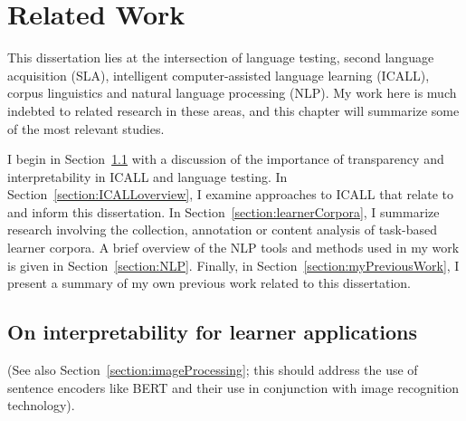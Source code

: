 \chapter{Related Work}
\label{chap:lit}

This dissertation lies at the intersection of language testing, second language acquisition (SLA), intelligent computer-assisted language learning (ICALL), corpus linguistics and natural language processing (NLP). My work here is much indebted to related research in these areas, and this chapter will summarize some of the most relevant studies.


I begin in Section~\ref{section:ICALLinterp} with a discussion of the importance of transparency and interpretability in ICALL and language testing. In  Section~\ref{section:ICALLoverview}, I examine approaches to ICALL that relate to and inform this dissertation. In Section~\ref{section:learnerCorpora}, I summarize research involving the collection, annotation or content analysis of task-based learner corpora. A brief overview of the NLP tools and methods used in my work is given in Section~\ref{section:NLP}. Finally, in Section~\ref{section:myPreviousWork}, I present a summary of my own previous work related to this dissertation. 

\section{On interpretability for learner applications}
\label{section:ICALLinterp}

(See also Section~\ref{section:imageProcessing}; this should address the use of sentence encoders like BERT and their use in conjunction with image recognition technology).

